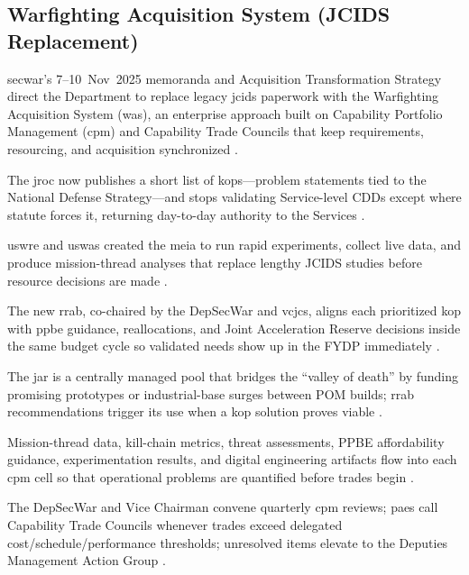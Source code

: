 \documentclass[../main.tex]{subfiles}
\begin{document}
\subsection{Warfighting Acquisition System (JCIDS Replacement)}
\ac{secwar}'s 7--10~Nov~2025 memoranda and Acquisition Transformation Strategy direct the Department to replace legacy \ac{jcids} paperwork with the Warfighting Acquisition System (\ac{was}), an enterprise approach built on Capability Portfolio Management (\ac{cpm}) and Capability Trade Councils that keep requirements, resourcing, and acquisition synchronized \autocite{secwar-was-memo-2025,secwar-acq-transformation-2025}.
\begin{description}[style=nextline,labelsep=0.5em,font=\bfseries]
  \item[\textbf{Key Operational Problems.}] The \ac{jroc} now publishes a short list of \acp{kop}---problem statements tied to the National Defense Strategy---and stops validating Service-level CDDs except where statute forces it, returning day-to-day authority to the Services \autocite{secwar-jcids-reform-2025}.
  \item[\textbf{Mission Engineering \& Integration Activity.}] \ac{uswre} and \ac{uswas} created the \ac{meia} to run rapid experiments, collect live data, and produce mission-thread analyses that replace lengthy JCIDS studies before resource decisions are made \autocite{secwar-jcids-reform-2025,secwar-was-memo-2025}.
  \item[\textbf{Requirements \& Resourcing Alignment Board.}] The new \ac{rrab}, co-chaired by the DepSecWar and \ac{vcjcs}, aligns each prioritized \ac{kop} with \ac{ppbe} guidance, reallocations, and Joint Acceleration Reserve decisions inside the same budget cycle so validated needs show up in the FYDP immediately \autocite{secwar-jcids-reform-2025}.
  \item[\textbf{Joint Acceleration Reserve.}] The \ac{jar} is a centrally managed pool that bridges the ``valley of death'' by funding promising prototypes or industrial-base surges between POM builds; \ac{rrab} recommendations trigger its use when a \ac{kop} solution proves viable \autocite{secwar-jcids-reform-2025}.
  \item[\textbf{Inputs.}] Mission-thread data, kill-chain metrics, threat assessments, PPBE affordability guidance, experimentation results, and digital engineering artifacts flow into each \ac{cpm} cell so that operational problems are quantified before trades begin \autocite{secwar-acq-transformation-2025}.
  \item[\textbf{Core events.}] The DepSecWar and Vice Chairman convene quarterly \ac{cpm} reviews; \acp{pae} call Capability Trade Councils whenever trades exceed delegated cost/schedule/performance thresholds; unresolved items elevate to the Deputies Management Action Group \autocite{secwar-acq-transformation-2025}.

\end{description}
\end{document}
